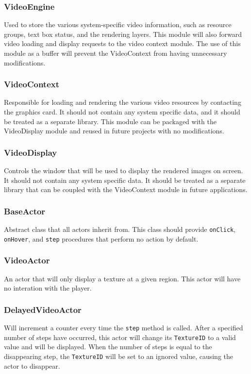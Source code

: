 \documentclass{article}
\begin{document}
    \subsubsection{VideoEngine}
      Used to store the various system-specific video information, such as resource groups, text box status, and the rendering layers. This module will also forward video loading and display requests to the video context module. The use of this module as a buffer will prevent the VideoContext from having unnecessary modifications.
    \subsubsection{VideoContext}
      Responsible for loading and rendering the various video resources by contacting the graphics card. It should not contain any system specific data, and it should be treated as a separate library. This module can be packaged with the VideoDisplay module and reused in future projects with no modifications.
    \subsubsection{VideoDisplay}
      Controls the window that will be used to display the rendered images on screen. It should not contain any system specific data. It should be treated as a separate library that can be coupled with the VideoContext module in future applications.
    \subsubsection{BaseActor}
    Abstract class that all actors inherit from. This class should provide \texttt{onClick}, \texttt{onHover}, and \texttt{step} procedures that perform no action by default.
    \subsubsection{VideoActor}
    An actor that will only display a texture at a given region. This actor will have no interation with the player.
    \subsubsection{DelayedVideoActor}
    Will increment a counter every time the \texttt{step} method is called. After a specified number of steps have occurred, this actor will change its \texttt{TextureID} to a valid value and will be displayed. When the number of steps is equal to the disappearing step, the \texttt{TextureID} will be set to an ignored value, causing the actor to disappear.
\end{document}
